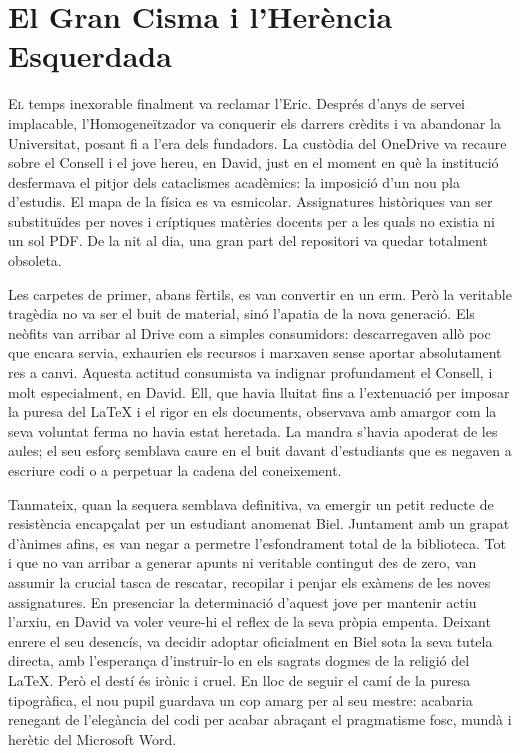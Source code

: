 \chapter{El Gran Cisma i l'Herència Esquerdada}


\lettrine[loversize=0.2, lines=2]{E}{l} temps inexorable finalment va reclamar l'Eric. Després d'anys de servei implacable, l'Homogeneïtzador va conquerir els darrers crèdits i va abandonar la Universitat, posant fi a l'era dels fundadors. La custòdia del OneDrive va recaure sobre el Consell i el jove hereu, en David, just en el moment en què la institució desfermava el pitjor dels cataclismes acadèmics: la imposició d'un nou pla d'estudis. El mapa de la física es va esmicolar. Assignatures històriques van ser substituïdes per noves i críptiques matèries docents per a les quals no existia ni un sol PDF. De la nit al dia, una gran part del repositori va quedar totalment obsoleta.

Les carpetes de primer, abans fèrtils, es van convertir en un erm. Però la veritable tragèdia no va ser el buit de material, sinó l'apatia de la nova generació. Els neòfits van arribar al Drive com a simples consumidors: descarregaven allò poc que encara servia, exhaurien els recursos i marxaven sense aportar absolutament res a canvi. Aquesta actitud consumista va indignar profundament el Consell, i molt especialment, en David. Ell, que havia lluitat fins a l'extenuació per imposar la puresa del LaTeX i el rigor en els documents, observava amb amargor com la seva voluntat ferma no havia estat heretada. La mandra s'havia apoderat de les aules; el seu esforç semblava caure en el buit davant d'estudiants que es negaven a escriure codi o a perpetuar la cadena del coneixement.

Tanmateix, quan la sequera semblava definitiva, va emergir un petit reducte de resistència encapçalat per un estudiant anomenat Biel. Juntament amb un grapat d'ànimes afins, es van negar a permetre l'esfondrament total de la biblioteca. Tot i que no van arribar a generar apunts ni veritable contingut des de zero, van assumir la crucial tasca de rescatar, recopilar i penjar els exàmens de les noves assignatures. En presenciar la determinació d'aquest jove per mantenir actiu l'arxiu, en David va voler veure-hi el reflex de la seva pròpia empenta. Deixant enrere el seu desencís, va decidir adoptar oficialment en Biel sota la seva tutela directa, amb l'esperança d'instruir-lo en els sagrats dogmes de la religió del LaTeX. Però el destí és irònic i cruel. En lloc de seguir el camí de la puresa tipogràfica, el nou pupil guardava un cop amarg per al seu mestre: acabaria renegant de l'elegància del codi per acabar abraçant el pragmatisme fosc, mundà i herètic del Microsoft Word.

